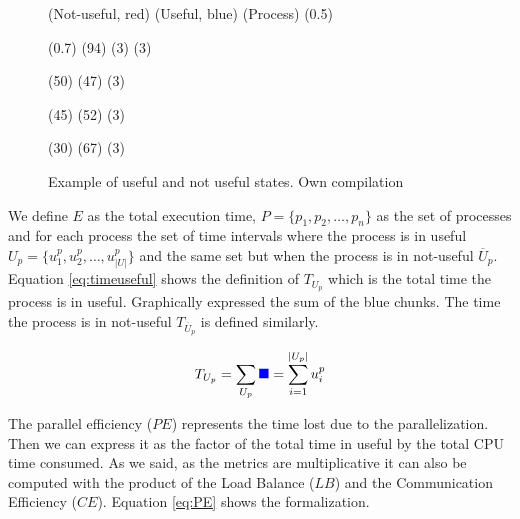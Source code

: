     \begin{figure}[htbp]
      \centering
      \begin{tracedraw}{0.6}
        \tracedrawAddToLegend(\large{Not-useful}, red)
        \tracedrawAddToLegend(\large{Useful}, blue)
        \tracedrawEnableLineName(\large{Process})
        \tracedrawSetLegendColorScale(0.5)

        \tracedrawSetLineHeight(0.7)
        \tracedrawAddChunk[color=gray, fill=blue](94)
        \tracedrawAddChunk[color=gray, fill=red](3)
        \tracedrawAddChunk[color=gray, fill=blue](3)

        \tracedrawNewLine

        \tracedrawAddChunk[color=gray, fill=blue](50)
        \tracedrawAddChunk[color=gray, fill=red](47)
        \tracedrawAddChunk[color=gray, fill=blue](3)

        \tracedrawNewLine
        
        \tracedrawAddChunk[color=gray, fill=blue](45)
        \tracedrawAddChunk[color=gray, fill=red](52)
        \tracedrawAddChunk[color=gray, fill=blue](3)

        \tracedrawNewLine
        
        \tracedrawAddChunk[color=gray, fill=blue](30)
        \tracedrawAddChunk[color=gray, fill=red](67)
        \tracedrawAddChunk[color=gray, fill=blue](3)

      \end{tracedraw}
      \caption[Example of useful and not useful states.]{Example of useful and not useful states. Own compilation}
      \label{fig:usefulnot}
    \end{figure}

    We define $E$ as the total execution time, $P = \{p_1,p_2,\dots, p_n\}$ as the set of processes and for each process the set of time intervals where the process is in useful $U_p = \{u_1^{p},u_2^{p},\dots,u_{|U|}^{p}\}$ and the same set but when the process is in not-useful $\overline{U}_p$. Equation \ref{eq:timeuseful} shows the definition of $T_{U_p}$ which is the total time the process is in useful. Graphically expressed the sum of the blue chunks. The time the process is in not-useful $T_{\overline{U}_p}$ is defined similarly.

    \begin{equation}\label{eq:timeuseful}
      T_{U_p}=\sum_{U_p}\textcolor{blue}{\blacksquare}=\sum_{i=1}^{|U_p|}u^p_{i} 
    \end{equation}

    The parallel efficiency ($PE$) represents the time lost due to the parallelization. Then we can express it as the factor of the total time in useful by the total CPU time consumed. As we said, as the metrics are multiplicative it can also be computed with the product of the Load Balance ($LB$) and the Communication Efficiency ($CE$). Equation \ref{eq:PE} shows the formalization.

